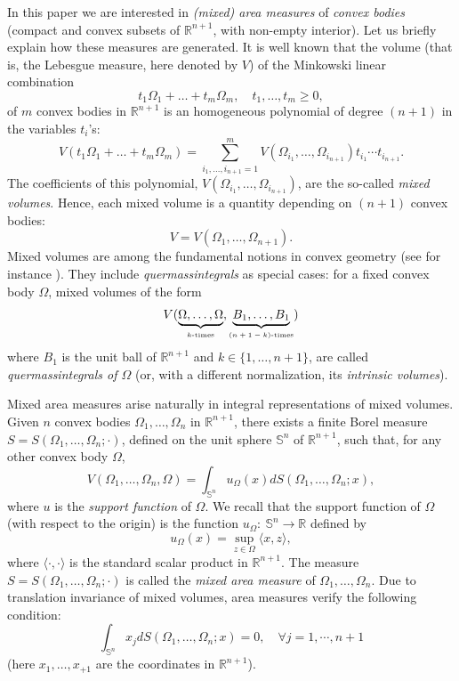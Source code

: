 \documentclass[12pt]{amsart}
\newcommand{\R}{\mathbb R}
\newcommand{\1}{\mathbf 1}
\newcommand{\s}{\mathbb S}
\newcommand{\sfe}{{{\mathbb S}^{n}}}
\begin{document}
In this paper we are interested in {\em (mixed) area measures} of {\em convex bodies} (compact and convex subsets of $\R^{n+1}$, with non-empty interior). Let us briefly explain how these measures are generated. It is well known that the volume (that is, the Lebesgue measure, here denoted by $V$) of the Minkowski linear combination 
$$
t_1\Omega_1+\dots+t_m\Omega_m,\quad t_1,\dots,t_m\ge0,
$$
of $m$ convex bodies in $\R^{n+1}$ is an homogeneous polynomial of degree $(n+1)$ in the variables $t_i$'s:
$$
V(t_1\Omega_1+\dots+t_m\Omega_m)=\sum_{i_1,\dots,i_{n+1}=1}^m V(\Omega_{i_1},\dots,\Omega_{i_{n+1}})t_{i_1}\cdots t_{i_{n+1}}.
$$
The coefficients of this polynomial, $V(\Omega_{i_1},\dots,\Omega_{i_{n+1}})$, are the so-called {\em mixed volumes}. Hence, each mixed volume is a quantity depending on $(n+1)$ convex bodies:
$$
V=V(\Omega_1,\dots,\Omega_{n+1}).
$$
Mixed volumes are among the fundamental notions in convex geometry (see for instance \cite{Schneider}). They include {\em quermassintegrals} as special cases: for a fixed convex body $\Omega$, mixed volumes of the form
$$
V(\underbrace{\Omega,\dots,\Omega}_{\mbox{\tiny $k$-times}},\underbrace{B_1,\dots,B_1}_{\mbox{\tiny $(n+1-k)$-times}})
$$
where $B_1$ is the unit ball of $\R^{n+1}$ and $k\in\{1,\dots,n+1\}$, are called {\em quermassintegrals of $\Omega$} (or, with a different normalization, its {\em intrinsic volumes}). 

Mixed area measures arise naturally in integral representations of mixed volumes. Given $n$ convex bodies $\Omega_1,\dots,\Omega_n$ in $\R^{n+1}$, there exists a finite Borel measure $S=S(\Omega_1,\dots,\Omega_n;\cdot)$, defined on the unit sphere $\sfe$ of $\R^{n+1}$, such that, for any other convex body $\Omega$,  
$$
V(\Omega_1,\dots,\Omega_n,\Omega)=\int_{\sfe}u_{\Omega}(x)dS(\Omega_1,\dots,\Omega_n;x),
$$
where $u$ is the {\em support function} of $\Omega$. We recall that the support function of $\Omega$ (with respect to the origin) is the function $u_\Omega: \ \sfe\to\R$ defined by
$$
u_\Omega(x)=\sup_{z\in\Omega}\langle x,z\rangle,
$$
where $\langle\cdot,\cdot\rangle$ is the standard scalar product in $\mathbb{R}^{n+1}$. The measure $S=S(\Omega_1,\dots,\Omega_n;\cdot)$ is called the {\em mixed area measure} of $\Omega_1,\dots,\Omega_n$. Due to translation invariance of mixed volumes, area measures verify the following condition:
\begin{equation}\label{comp-cond 0-0}
\int_{\s^n} x_j dS(\Omega_1,\dots,\Omega_n;x)=0, \quad \forall j=1,\cdots, n+1
\end{equation}
(here $x_1,\dots,x_{+1}$ are the coordinates in $\R^{n+1}$).
\end{document}
